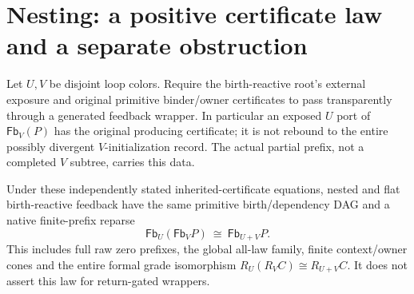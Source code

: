 \documentclass[11pt]{article}
\begin{document}
\section{Nesting: a positive certificate law and a separate obstruction}
Let $U,V$ be disjoint loop colors. Require the birth-reactive root's external exposure and original primitive binder/owner certificates to pass transparently through a generated feedback wrapper. In particular an exposed $U$ port of $\mathsf{Fb}_V(P)$ has the original producing certificate; it is not rebound to the entire possibly divergent $V$-initialization record. The actual partial prefix, not a completed $V$ subtree, carries this data.

\begin{theorem}
Under these independently stated inherited-certificate equations, nested and flat birth-reactive feedback have the same primitive birth/dependency DAG and a native finite-prefix reparse
\[
    \mathsf{Fb}_U(\mathsf{Fb}_V P)\ \cong\
    \mathsf{Fb}_{U+V}P.
\]
This includes full raw zero prefixes, the global all-law family, finite context/owner cones and the entire formal grade isomorphism $R_U(R_V C)\cong R_{U+V}C$. It does not assert this law for return-gated wrappers.
\end{theorem}
\end{document}
